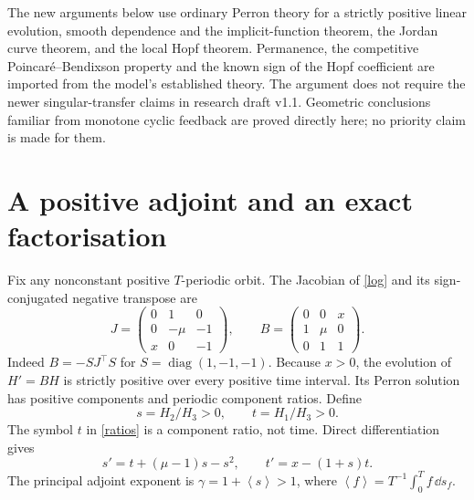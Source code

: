 \documentclass[11pt,a4paper]{article}
\theoremstyle{remark}\newtheorem{remark}[theorem]{Remark}
\newcommand{\av}[1]{\left\langle #1\right\rangle}
\begin{document}
The new arguments below use ordinary Perron theory for a strictly positive linear evolution, smooth dependence and the implicit-function theorem, the Jordan curve theorem, and the local Hopf theorem. Permanence, the competitive Poincar\'e--Bendixson property and the known sign of the Hopf coefficient are imported from the model's established theory. The argument does not require the newer singular-transfer claims in research draft v1.1. Geometric conclusions familiar from monotone cyclic feedback \cite{MPS} are proved directly here; no priority claim is made for them.

\section{A positive adjoint and an exact factorisation}
Fix any nonconstant positive $T$-periodic orbit. The Jacobian of \eqref{log} and its sign-conjugated negative transpose are
\[
 J=\begin{pmatrix}0&1&0\\0&-\mu&-1\\x&0&-1\end{pmatrix},\qquad
 B=\begin{pmatrix}0&0&x\\1&\mu&0\\0&1&1\end{pmatrix}.
\]
Indeed $B=-S J^\top S$ for $S=\operatorname{diag}(1,-1,-1)$. Because $x>0$, the evolution of $H'=BH$ is strictly positive over every positive time interval. Its Perron solution has positive components and periodic component ratios. Define
\begin{equation}\label{ratios}
 s=H_2/H_3>0,\qquad t=H_1/H_3>0.
\end{equation}
The symbol $t$ in \eqref{ratios} is a component ratio, not time. Direct differentiation gives
\begin{equation}\label{projective}
 s'=t+(\mu-1)s-s^2,\qquad t'=x-(1+s)t.
\end{equation}
The principal adjoint exponent is $\gamma=1+\av{s}>1$, where $\av{f}=T^{-1}\int_0^T f\,\dd s_f$.
\end{document}
